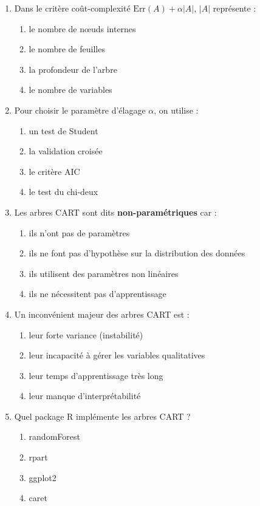 \documentclass[a4paper,11pt]{article}
\begin{document}
\begin{enumerate}
    \item Dans le critère coût-complexité $\text{Err}(A) + \alpha|A|$, $|A|$ représente :
    \begin{enumerate}
        \item le nombre de nœuds internes
        \item le nombre de feuilles
        \item la profondeur de l'arbre
        \item le nombre de variables
    \end{enumerate}

    \item Pour choisir le paramètre d'élagage $\alpha$, on utilise :
    \begin{enumerate}
        \item un test de Student
        \item la validation croisée
        \item le critère AIC
        \item le test du chi-deux
    \end{enumerate}

    \item Les arbres CART sont dits \textbf{non-paramétriques} car :
    \begin{enumerate}
        \item ils n'ont pas de paramètres
        \item ils ne font pas d'hypothèse sur la distribution des données
        \item ils utilisent des paramètres non linéaires
        \item ils ne nécessitent pas d'apprentissage
    \end{enumerate}

    \item Un inconvénient majeur des arbres CART est :
    \begin{enumerate}
        \item leur forte variance (instabilité)
        \item leur incapacité à gérer les variables qualitatives
        \item leur temps d'apprentissage très long
        \item leur manque d'interprétabilité
    \end{enumerate}

    \item Quel package R implémente les arbres CART ?
    \begin{enumerate}
        \item randomForest
        \item rpart
        \item ggplot2
        \item caret
    \end{enumerate}

\end{enumerate}
\end{document}
